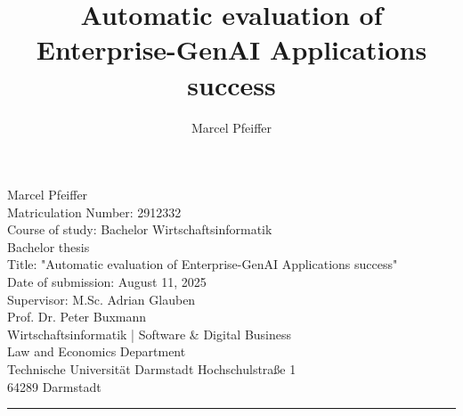 \documentclass[
	english,
	ruledheaders=section,%
	class=report,%
	thesis={type=bachelor},%
	accentcolor=1b,%
	custommargins=true,%
	marginpar=false,%
	parskip=half-,%
	fontsize=11pt,%
	DIV=14,
]{tudapub}
\begin{document}


\title{Automatic evaluation of Enterprise-GenAI Applications success}

\author[M. Pfeiffer]{Marcel Pfeiffer}%




\maketitle
\newpage 

\begin{titlepage}

    \noindent
    Marcel Pfeiffer \\
    Matriculation Number: 2912332 \\
    Course of study: Bachelor Wirtschaftsinformatik \\[0.75em]
    
    Bachelor thesis \\
    Title: "Automatic evaluation of Enterprise-GenAI Applications success" \\[0.75em]
    
    Date of submission: August 11, 2025 \\[0.75em]
    
    Supervisor: M.Sc. Adrian Glauben \\[0.75em]
    \noindent
    Prof. Dr. Peter Buxmann \\
    Wirtschaftsinformatik | Software \& Digital Business \\
    Law and Economics Department \\
    Technische Universität Darmstadt Hochschulstraße 1 \\
    64289 Darmstadt\\
    \noindent\rule{\textwidth}{0.4pt}
    
\end{titlepage}
\affidavit
\end{document}
